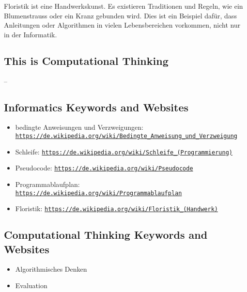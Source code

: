 \documentclass[a4paper,11pt]{report}
\newcommand{\BrochureUrlText}[1]{\texttt{#1}}
\begin{document}
Floristik ist eine Handwerkskunst. Es existieren Traditionen und Regeln, wie ein Blumenstrauss oder ein Kranz gebunden wird. Dies ist ein Beispiel dafür, dass Anleitungen oder Algorithmen in vielen Lebensbereichen vorkommen, nicht nur in der Informatik.


\subsection*{This is Computational Thinking}

–


\subsection*{Informatics Keywords and Websites}

\begin{itemize}
  \item bedingte Anweisungen und Verzweigungen: \href{https://de.wikipedia.org/wiki/Bedingte_Anweisung_und_Verzweigung}{\BrochureUrlText{https://de.wikipedia.org/wiki/Bedingte\_Anweisung\_und\_Verzweigung}}
  \item Schleife: \href{https://de.wikipedia.org/wiki/Schleife_(Programmierung)}{\BrochureUrlText{https://de.wikipedia.org/wiki/Schleife\_(Programmierung)}}
  \item Pseudocode: \href{https://de.wikipedia.org/wiki/Pseudocode}{\BrochureUrlText{https://de.wikipedia.org/wiki/Pseudocode}}
  \item Programmablaufplan: \href{https://de.wikipedia.org/wiki/Programmablaufplan}{\BrochureUrlText{https://de.wikipedia.org/wiki/Programmablaufplan}}
  \item Floristik: \href{https://de.wikipedia.org/wiki/Floristik_(Handwerk)}{\BrochureUrlText{https://de.wikipedia.org/wiki/Floristik\_(Handwerk)}}
\end{itemize}


\subsection*{Computational Thinking Keywords and Websites}

\begin{itemize}
  \item Algorithmisches Denken
  \item Evaluation
\end{itemize}
\end{document}
